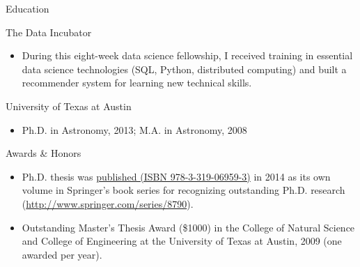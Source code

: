 \documentclass{article}
\newlength{\tabin}
\newlength{\secsep}
\newcommand{\lineunder}{\vspace*{-8pt} \\ \hspace*{-6pt} \hrulefill \\ \vspace*{-15pt}}
\newenvironment{tabbedsection}[1]{
  \begin{list}{}{
      \setlength{\itemsep}{0pt}
      \setlength{\labelsep}{0pt}
      \setlength{\labelwidth}{0pt}
      \setlength{\leftmargin}{\tabin}
      \setlength{\rightmargin}{\tabin}
      \setlength{\listparindent}{0pt}
      \setlength{\parsep}{0pt}
      \setlength{\parskip}{0pt}
      \setlength{\partopsep}{0pt}
      \setlength{\topsep}{#1}
    }
  \item[]
}{\end{list}}
\newenvironment{resume_section}[1]{
  \filbreak
  \vspace{2\secsep}
  \textsc{\large#1}
  \lineunder
  \begin{tabbedsection}{\secsep}
}{\end{tabbedsection}}
\newenvironment{resume_subsection}[2][]{
  \textbf{#2} \hfill {\footnotesize #1} \hspace{2em}
  \begin{tabbedsection}{0.5\secsep}
}{\end{tabbedsection}}
\newenvironment{subitems}{
  \renewcommand{\labelitemi}{-}
  \begin{itemize}
      \setlength{\labelsep}{1em}
}{\end{itemize}}
\begin{document}
\begin{resume_section}{Education}

  \begin{resume_subsection}{The Data Incubator}
      \begin{subitems}
          \item During this eight-week data science fellowship, I received training in essential data science technologies (SQL, Python, distributed computing) and built a recommender system for learning new technical skills.
      \end{subitems}
  \end{resume_subsection}

  \begin{resume_subsection}[Austin, TX (2006--2013)]{University of Texas at Austin}
      \begin{subitems}
          \item Ph.D. in Astronomy, 2013; M.A. in Astronomy, 2008
      \end{subitems}
  \end{resume_subsection}

\end{resume_section}

\begin{resume_section}{Awards \& Honors}
\begin{subitems}

\item Ph.D. thesis was 
\href{http://www.springer.com/us/book/9783319069586}{published (ISBN 978-3-319-06959-3)}
in 2014 as its own volume in Springer's book series for recognizing outstanding Ph.D. research (\url{http://www.springer.com/series/8790}). 
\item Outstanding Master's Thesis Award (\$1000) in the College of Natural 
Science and College of Engineering at the University of Texas at Austin, 2009 (one awarded per year).

        \end{subitems}
\end{resume_section}
\end{document}
